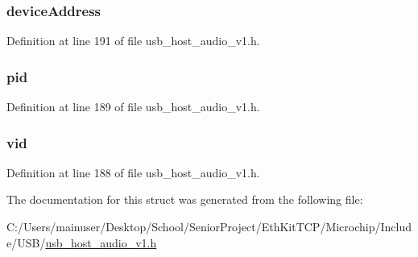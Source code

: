 \subsubsection[{device\+Address}]{ device\+Address}\label{struct___u_s_b___a_u_d_i_o___v1___d_e_v_i_c_e___i_d_aa1d659071a17ee8d0172d34d6783b517}


Definition at line 191 of file usb\+\_\+host\+\_\+audio\+\_\+v1.\+h.

\hypertarget{struct___u_s_b___a_u_d_i_o___v1___d_e_v_i_c_e___i_d_a718a3b94d880d84d1532ae6411eb60cc}{}
\subsubsection[{pid}]{ pid}\label{struct___u_s_b___a_u_d_i_o___v1___d_e_v_i_c_e___i_d_a718a3b94d880d84d1532ae6411eb60cc}


Definition at line 189 of file usb\+\_\+host\+\_\+audio\+\_\+v1.\+h.

\hypertarget{struct___u_s_b___a_u_d_i_o___v1___d_e_v_i_c_e___i_d_a9fcc011b7b6427b55322964f2d01781f}{}
\subsubsection[{vid}]{ vid}\label{struct___u_s_b___a_u_d_i_o___v1___d_e_v_i_c_e___i_d_a9fcc011b7b6427b55322964f2d01781f}


Definition at line 188 of file usb\+\_\+host\+\_\+audio\+\_\+v1.\+h.



The documentation for this struct was generated from the following file\+:\begin{DoxyCompactItemize}
\item 
C\+:/\+Users/mainuser/\+Desktop/\+School/\+Senior\+Project/\+Eth\+Kit\+T\+C\+P/\+Microchip/\+Include/\+U\+S\+B/\hyperlink{usb__host__audio__v1_8h}{usb\+\_\+host\+\_\+audio\+\_\+v1.\+h}\end{DoxyCompactItemize}
